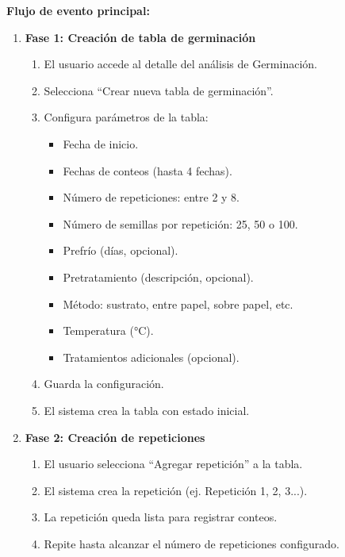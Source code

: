 \vspace{0.5em}
\noindent\textbf{Flujo de evento principal:}
\begin{enumerate}[nosep]
    \item \textbf{Fase 1: Creación de tabla de germinación}
    \begin{enumerate}[nosep]
        \item El usuario accede al detalle del análisis de Germinación.
        \item Selecciona ``Crear nueva tabla de germinación''.
        \item Configura parámetros de la tabla:
        \begin{itemize}[nosep]
            \item Fecha de inicio.
            \item Fechas de conteos (hasta 4 fechas).
            \item Número de repeticiones: entre 2 y 8.
            \item Número de semillas por repetición: 25, 50 o 100.
            \item Prefrío (días, opcional).
            \item Pretratamiento (descripción, opcional).
            \item Método: sustrato, entre papel, sobre papel, etc.
            \item Temperatura (°C).
            \item Tratamientos adicionales (opcional).
        \end{itemize}
        \item Guarda la configuración.
        \item El sistema crea la tabla con estado inicial.
    \end{enumerate}

    \item \textbf{Fase 2: Creación de repeticiones}
    \begin{enumerate}[nosep]
        \item El usuario selecciona ``Agregar repetición'' a la tabla.
        \item El sistema crea la repetición (ej. Repetición 1, 2, 3...).
        \item La repetición queda lista para registrar conteos.
        \item Repite hasta alcanzar el número de repeticiones configurado.
    \end{enumerate}


\end{enumerate}
